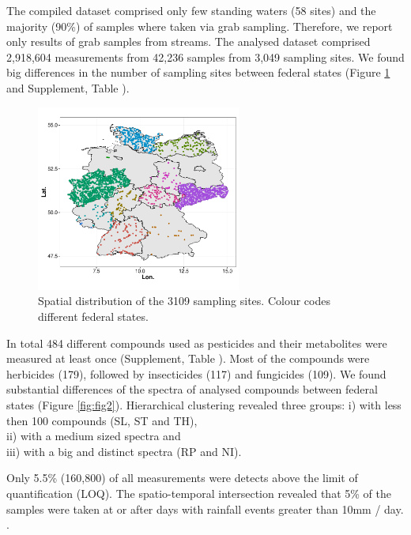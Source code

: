 \documentclass[journal=esthag,manuscript=article]{achemso}
\begin{document}
The compiled dataset comprised only few standing waters (58 sites) and the majority (90\%) of samples where taken via grab sampling.  %
Therefore, we report only results of grab samples from streams. 
The analysed dataset comprised 2,918,604 measurements from 42,236 samples from 3,049 sampling sites.  %
We found big differences in the number of sampling sites between federal states (Figure \ref{fig:fig1} and Supplement, Table ).

\begin{figure}[ht]
  \includegraphics[width=0.6\textwidth]{figure1.pdf}
  \caption{Spatial distribution of the 3109 sampling sites. Colour codes different federal states.}
  \label{fig:fig1}
\end{figure}

In total 484 different compounds used as pesticides and their metabolites were measured at least once (Supplement, Table ). 
Most of the compounds were herbicides (179), followed by insecticides (117) and fungicides (109).
We found substantial differences of the spectra of analysed compounds between federal states (Figure \ref{fig:fig2}).
Hierarchical clustering revealed three groups:
i) with less then 100 compounds (SL, ST and TH), \\
ii) with a medium sized spectra and \\
iii) with a big and distinct spectra (RP and NI).

Only 5.5\% (160,800) of all measurements were detects above the limit of quantification (LOQ).
The spatio-temporal intersection revealed that 5\% of the samples were taken at or after days with rainfall events greater than 10mm / day. .
\end{document}
